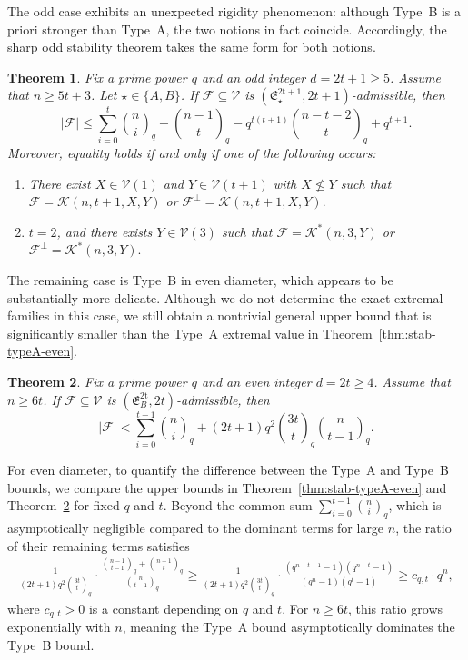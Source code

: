 \documentclass[11pt]{article}
\newtheorem{theorem}{Theorem}[section]
\theoremstyle{definition}
\newcommand{\qbinom}[2]{\genfrac{(}{)}{0pt}{}{#1}{#2}_q}
\begin{document}
The odd case exhibits an unexpected rigidity phenomenon: although Type~B is a priori stronger than Type~A, the two notions in fact coincide. Accordingly, the sharp odd stability theorem takes the same form for both notions.

\begin{theorem}\label{thm:stab-type-odd}
Fix a prime power $q$ and an odd integer $d=2t+1\ge 5$.
Assume that $n\ge 5t+3$.
Let $\star\in\{A,B\}$. If $\mathcal F\subseteq \mathcal V$ is $(\mathfrak E_\star^{\mathrm{2t+1}},2t+1)$-admissible, then
\[
|\mathcal F|
\le
\sum_{i=0}^{t}\qbinom{n}{i}
+
\qbinom{n-1}{t}
-
q^{t(t+1)}\qbinom{n-t-2}{t}
+
q^{t+1}.
\]
Moreover, equality holds if and only if one of the following occurs:
\begin{enumerate}
\item[\textup{(1)}] There exist $X\in\mathcal V(1)$ and $Y\in\mathcal V(t+1)$ with
$X\not\le Y$ such that
\(
\mathcal F=\mathcal K(n,t+1,X,Y)\) or
\(
\mathcal F^\perp=\mathcal K(n,t+1,X,Y).
\)

\item[\textup{(2)}] $t=2$, and there exists $Y\in\mathcal V(3)$ such that
\(
\mathcal F=\mathcal K^*(n,3,Y)\) or
\(
\mathcal F^\perp=\mathcal K^*(n,3,Y).
\)
\end{enumerate}
\end{theorem}

The remaining case is Type~B in even diameter, which appears to be substantially more delicate. Although we do not determine the exact extremal families in this case, we still obtain a nontrivial general upper bound that is significantly smaller than the Type~A extremal value in Theorem~\ref{thm:stab-typeA-even}.

\begin{theorem}\label{thm:stab-typeB-even}
Fix a prime power $q$ and an even integer $d=2t\ge 4$.
Assume that $n\ge 6t$.
If $\mathcal F\subseteq \mathcal V$ is $(\mathfrak E_B^{\mathrm{2t}},2t)$-admissible, then
\[
|\mathcal F|
<
\sum_{i=0}^{t-1}\qbinom{n}{i}
+
(2t+1)q^2\qbinom{3t}{t}\qbinom{n}{t-1}.
\]
\end{theorem}


For even diameter, to quantify the difference between the Type~A and Type~B bounds, we compare the upper bounds in Theorem~\ref{thm:stab-typeA-even} and Theorem~\ref{thm:stab-typeB-even} for fixed $q$ and $t$.
Beyond the common sum $\sum_{i=0}^{t-1}\qbinom{n}{i}$, which is asymptotically negligible compared to the dominant terms for large $n$, the ratio of their remaining terms satisfies
\begin{align*}
\frac{1}{(2t+1)q^2\qbinom{3t}{t}}
\cdot
\frac{\qbinom{n-1}{t-1}+\qbinom{n-1}{t}}{\qbinom{n}{t-1}}
\ge 
\frac{1}{(2t+1)q^2\qbinom{3t}{t}} \cdot
\frac{(q^{n-t+1}-1)(q^{n-t}-1)}{(q^n-1)(q^t-1)}
\ge c_{q,t} \cdot q^{n},
\end{align*}
where $c_{q,t} > 0$ is a constant depending on $q$ and $t$. For $n \ge 6t$, this ratio grows exponentially with $n$, meaning the Type~A bound asymptotically dominates the Type~B bound. 
\end{document}
